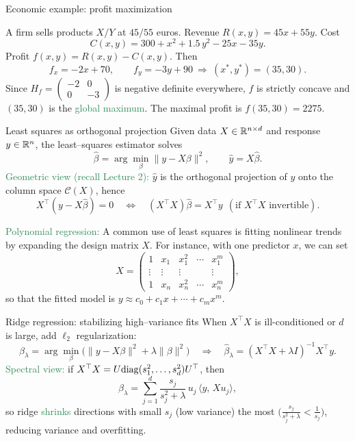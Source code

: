 \documentclass[11pt,aspectratio=169]{beamer}
\begin{document}
\begin{frame}{Economic example: profit maximization}

A firm sells products \(X/Y\) at \(45/55\) euros. Revenue \(R(x,y)=45x+55y\). Cost
\[
C(x,y)=300+x^2+1.5\,y^2-25x-35y.
\]
Profit \(f(x,y)=R(x,y)-C(x,y)\). Then
\[
f_x=-2x+70,\qquad f_y=-3y+90 \ \Rightarrow\ (x^\ast,y^\ast)=(35,30).
\]
Since \(H_f=\begin{pmatrix}-2&0\\[2pt]0&-3\end{pmatrix}\) is negative definite everywhere, \(f\) is strictly concave and \((35,30)\) is the \textcolor{SeaGreen}{global maximum}. The maximal profit is \(f(35,30)=2275\).

\end{frame}

\begin{frame}{Least squares as orthogonal projection}
Given data $X\in\mathbb R^{n\times d}$ and response $y\in\mathbb R^n$, the least–squares estimator solves
\[
\hat\beta=\arg\min_\beta \|y-X\beta\|^2,
\qquad
\hat y=X\hat\beta.
\]
\textcolor{SeaGreen}{Geometric view (recall Lecture 2):} $\hat y$ is the orthogonal projection of $y$ onto the column space $\mathcal C(X)$, hence
\[
X^\top (y-X\hat\beta)=0
\quad\Longleftrightarrow\quad
(X^\top X)\hat\beta=X^\top y
\ \ (\text{if $X^\top X$ invertible}).
\]

\medskip
\textcolor{SeaGreen}{Polynomial regression:}  
A common use of least squares is fitting nonlinear trends by expanding the design matrix $X$.  
For instance, with one predictor $x$, we can set
\[
X=\begin{pmatrix}
1 & x_1 & x_1^2 & \cdots & x_1^m\\
\vdots & \vdots & \vdots & & \vdots \\
1 & x_n & x_n^2 & \cdots & x_n^m
\end{pmatrix},
\]
so that the fitted model is $y\approx c_0+c_1 x+\cdots+c_m x^m$.
\end{frame}
\begin{frame}{Ridge regression: stabilizing high–variance fits}
When $X^\top X$ is ill-conditioned or $d$ is large, add $\ell_2$ regularization:
\[
\hat\beta_\lambda=\arg\min_\beta \big(\|y-X\beta\|^2+\lambda\|\beta\|^2\big)
\quad\Longrightarrow\quad
\hat\beta_\lambda=(X^\top X+\lambda I)^{-1}X^\top y.
\]
\textcolor{SeaGreen}{Spectral view:} if $X^\top X=U{\rm diag}(s_1^2,\ldots,s_d^2)U^\top$, then
\[
\hat\beta_\lambda
=\sum_{j=1}^d \frac{s_j}{s_j^2+\lambda}\, u_j\, \langle y,\, X u_j\rangle,
\]
so ridge \textcolor{SeaGreen}{shrinks} directions with small $s_j$ (low variance) the most $\big(\tfrac{s_j}{s_j^2+\lambda}<\tfrac1{s_j}\big)$, reducing variance and overfitting.
\end{frame}
\end{document}
